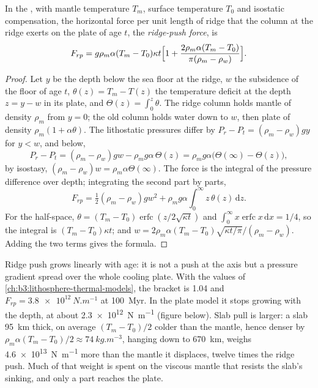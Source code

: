 \begin{proposition}\label{prop:b3:mantle-convection:ridge-push}
In the , with mantle temperature $T_m$, surface
temperature $T_0$ and isostatic compensation, the horizontal force per unit
length of ridge that the column at the ridge exerts on the plate of age $t$,
the \emph{ridge-push force}, is
\[
  F_{rp} = g\rho_m\alpha(T_m - T_0)\kappa t\Bigl[1 + \frac{2\rho_m\alpha(T_m
  - T_0)}{\pi(\rho_m - \rho_w)}\Bigr].
\]
\end{proposition}

\begin{proof}
Let $y$ be the depth below the sea floor at the ridge, $w$ the subsidence of
the floor of age $t$, $\theta(z) = T_m - T(z)$ the temperature deficit at the
depth $z = y - w$ in its plate, and $\Theta(z) = \int_0^z\theta$. The ridge
column holds mantle of density $\rho_m$ from $y = 0$; the old column holds
water down to $w$, then plate of density $\rho_m(1 + \alpha\theta)$. The
lithostatic pressures differ by $P_r - P_t = (\rho_m - \rho_w)gy$ for $y < w$,
and below,
\[
  P_r - P_t = (\rho_m - \rho_w)gw - \rho_mg\alpha\,\Theta(z)
  = \rho_mg\alpha\bigl(\Theta(\infty) - \Theta(z)\bigr),
\]
by isostasy, $(\rho_m - \rho_w)w = \rho_m\alpha\Theta(\infty)$. The force is the
integral of the pressure difference over depth; integrating the second part by
parts,
\[
  F_{rp} = \tfrac12(\rho_m - \rho_w)gw^2 + \rho_mg\alpha\int_0^\infty
  z\,\theta(z)\,\mathrm dz .
\]
For the half-space, $\theta = (T_m - T_0)\operatorname{erfc}(z/2\sqrt{\kappa
t})$ and $\int_0^\infty x\operatorname{erfc}x\,\mathrm dx = 1/4$, so the
integral is $(T_m - T_0)\kappa t$; and $w = 2\rho_m\alpha(T_m -
T_0)\sqrt{\kappa t/\pi}/(\rho_m - \rho_w)$. Adding the two terms gives the
formula.
\end{proof}

Ridge push grows linearly with age: it is not a push at the axis but a
pressure gradient spread over the whole cooling plate. With the values of
\cref{ch:b3:lithosphere-thermal-models}, the bracket is 1.04 and $F_{rp} =
\qty{3.8e12}{N.m^{-1}}$ at \qty{100}{Myr}. In the plate model it stops growing
with the depth, at about \qty{2.3e12}{N.m^{-1}} (figure below). Slab pull is
larger: a slab \qty{95}{km} thick, on average $(T_m - T_0)/2$ colder than the
mantle, hence denser by $\rho_m\alpha(T_m - T_0)/2 \approx
\qty{74}{kg.m^{-3}}$, hanging down to \qty{670}{km}, weighs
\qty{4.6e13}{N.m^{-1}} more than the mantle it displaces, twelve times the
ridge push. Much of that weight is spent on the viscous mantle that resists the
slab's sinking, and only a part reaches the plate.

